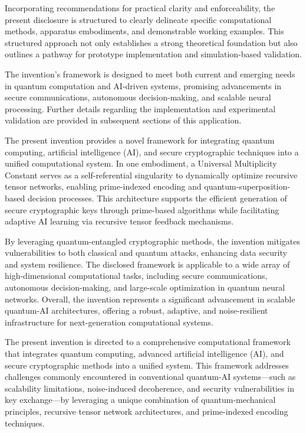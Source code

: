 \pa 
Incorporating recommendations for practical clarity and enforceability, the present disclosure is structured to clearly delineate specific computational methods, apparatus embodiments, and demonstrable working examples. This structured approach not only establishes a strong theoretical foundation but also outlines a pathway for prototype implementation and simulation-based validation.

\pa 
The invention’s framework is designed to meet both current and emerging needs in quantum computation and AI-driven systems, promising advancements in secure communications, autonomous decision-making, and scalable neural processing. Further details regarding the implementation and experimental validation are provided in subsequent sections of this application.


\pa 
The present invention provides a novel framework for integrating quantum computing, artificial intelligence (AI), and secure cryptographic techniques into a unified computational system. In one embodiment, a Universal Multiplicity Constant serves as a self-referential singularity to dynamically optimize recursive tensor networks, enabling prime-indexed encoding and quantum-superposition-based decision processes. This architecture supports the efficient generation of secure cryptographic keys through prime-based algorithms while facilitating adaptive AI learning via recursive tensor feedback mechanisms. 

\pa 
By leveraging quantum-entangled cryptographic methods, the invention mitigates vulnerabilities to both classical and quantum attacks, enhancing data security and system resilience. The disclosed framework is applicable to a wide array of high-dimensional computational tasks, including secure communications, autonomous decision-making, and large-scale optimization in quantum neural networks. Overall, the invention represents a significant advancement in scalable quantum-AI architectures, offering a robust, adaptive, and noise-resilient infrastructure for next-generation computational systems.



\pa The present invention is directed to a comprehensive computational framework that integrates quantum computing, advanced artificial intelligence (AI), and secure cryptographic methods into a unified system. This framework addresses challenges commonly encountered in conventional quantum-AI systems—such as scalability limitations, noise-induced decoherence, and security vulnerabilities in key exchange—by leveraging a unique combination of quantum-mechanical principles, recursive tensor network architectures, and prime-indexed encoding techniques.

